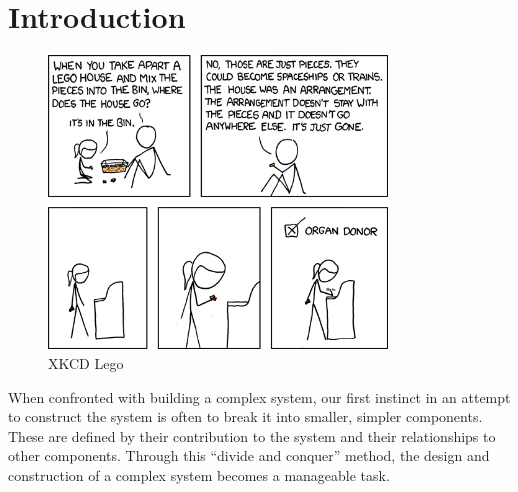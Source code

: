 \chapter{Introduction}
\label{introduction}


\begin{figure}[htp]
\begin{center}
  \includegraphics[width=9cm]{introductionpics/lego}
  \caption{XKCD Lego}
  \label{XKCDLego}
\end{center}
\end{figure}



{}When confronted with building a complex system, our first instinct in an attempt to construct the system is often to break it into smaller, simpler components. 
{}These are defined by their contribution to the system and their relationships to other components.
{}Through this ``divide and conquer'' method, the design and construction of a complex system becomes a manageable task.

